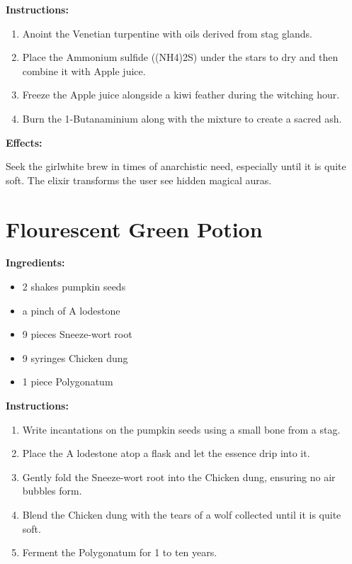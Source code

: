 \documentclass{article}
\begin{document}
\textbf{Instructions:}

\begin{enumerate}
  \item Anoint the Venetian turpentine with oils derived from stag glands.
  \item Place the Ammonium sulfide ((NH4)2S) under the stars to dry and then combine it with Apple juice.
  \item Freeze the Apple juice alongside a kiwi feather during the witching hour.
  \item Burn the 1-Butanaminium along with the mixture to create a sacred ash.
\end{enumerate}

\textbf{Effects:}

Seek the girlwhite brew in times of anarchistic need, especially until it is quite soft. The elixir transforms the user see hidden magical auras.

\newpage
\section*{Flourescent Green Potion}

\textbf{Ingredients:}

\begin{itemize}
  \item 2 shakes pumpkin seeds
  \item a pinch of A lodestone
  \item 9 pieces Sneeze-wort root
  \item 9 syringes Chicken dung
  \item 1 piece Polygonatum
\end{itemize}

\textbf{Instructions:}

\begin{enumerate}
  \item Write incantations on the pumpkin seeds using a small bone from a stag.
  \item Place the A lodestone atop a flask and let the essence drip into it.
  \item Gently fold the Sneeze-wort root into the Chicken dung, ensuring no air bubbles form.
  \item Blend the Chicken dung with the tears of a wolf collected until it is quite soft.
  \item Ferment the Polygonatum for 1 to ten years.
\end{enumerate}
\end{document}
